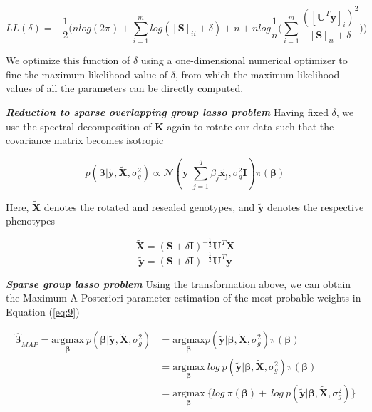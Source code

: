 \documentclass[11pt]{article}
\theoremstyle{plain}
\theoremstyle{definition}
\theoremstyle{remark}
\begin{document}
\begin{equation*}
LL(\delta)=-\frac{1}{2}\Bigg(nlog(2\pi)+\sum_{i=1}^mlog([\bm{S}]_{ii}+\delta)+n+nlog\frac{1}{n}\bigg(\sum_{i=1}^m\frac{([\bm{U}^T\bm{y}]_i)^2}{[\bm{S}]_{ii}+\delta}\bigg)\Bigg)
\end{equation*}

We optimize this function of $\delta$ using a one-dimensional numerical optimizer to fine the maximum likelihood value of $\delta$, from which the maximum likelihood values of all the parameters can be directly computed.

\textbf{\em Reduction to sparse overlapping group lasso problem} Having fixed $\delta$, we use the spectral decomposition of $\bm{K}$ again to rotate our data such that the covariance matrix becomes isotropic

\begin{equation}
\label{eq:9}
p(\bm{\beta}|\bm{\tilde{y}},\bm{\tilde{X}},\sigma_g^2)\propto\mathcal{N}(\bm{\tilde{y}}|\sum_{j=1}^q\beta_j\bm{\tilde{x_j}},\sigma_g^2\bm{I})\pi(\bm{\beta})
\end{equation}

Here, $\bm{\tilde{X}}$ denotes the rotated and resealed genotypes, and $\bm{\tilde{y}}$ denotes the respective phenotypes

\begin{equation*}
\bm{\tilde{X}}=(\bm{S}+\delta\bm{I})^{-\frac{1}{2}}\bm{U}^T\bm{X}
\end{equation*}
\begin{equation*}
\bm{\tilde{y}}=(\bm{S}+\delta\bm{I})^{-\frac{1}{2}}\bm{U}^T\bm{y}
\end{equation*}


\textbf{\em Sparse group lasso problem} Using the transformation above, we can obtain the Maximum-A-Posteriori parameter estimation of the most probable weights in Equation (\ref{eq:9})

\begin{equation}
\begin{aligned}
\hat{\bm\beta}_{MAP}=\underset{\bm{\beta}}{\mathrm{argmax}}\ p(\bm{\beta}|\bm{\tilde{y}},\bm{\tilde{X}},\sigma_g^2)&= \underset{\bm{\beta}}{\mathrm{argmax}}p(\bm{\tilde{y}}|\bm{\beta},\bm{\tilde{X}},\sigma_g^2)\pi(\bm{\beta})\\
&=\underset{\bm{\beta}}{\mathrm{argmax}}\ log\ p(\bm{\tilde{y}}|\bm{\beta},\bm{\tilde{X}},\sigma_g^2)\pi(\bm{\beta})\\
&=\underset{\bm{\beta}}{\mathrm{argmax}}\ \{log\ \pi(\bm{\beta})+\ log\ p(\bm{\tilde{y}}|\bm{\beta},\bm{\tilde{X}},\sigma_g^2)\}\\
\end{aligned}
\end{equation}
\end{document}
